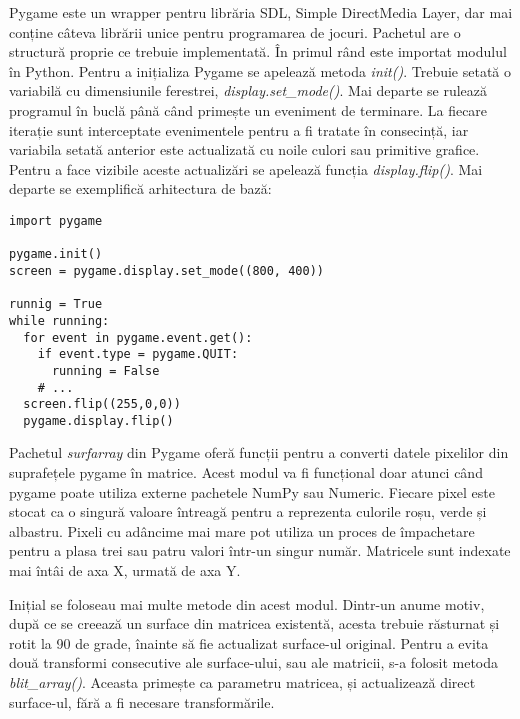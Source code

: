 Pygame este un wrapper pentru librăria SDL, Simple DirectMedia Layer, dar mai conține câteva librării unice pentru programarea de jocuri. Pachetul are o structură proprie ce trebuie implementată. În primul rând este importat modulul în Python. 
Pentru a inițializa Pygame se apelează metoda \textit{init()}. Trebuie setată o variabilă cu dimensiunile ferestrei, \textit{display.set\_mode()}. Mai departe se rulează programul în buclă până când primește un eveniment de terminare. La fiecare iterație sunt interceptate evenimentele pentru a fi tratate în consecință, iar variabila setată anterior este actualizată cu noile culori sau primitive grafice. Pentru a face vizibile aceste actualizări se apelează funcția \textit{display.flip()}. Mai departe se exemplifică arhitectura de bază:
\lstset{language=Python,frame=single, showstringspaces=false}
\begin{lstlisting}
import pygame

pygame.init()
screen = pygame.display.set_mode((800, 400))

runnig = True
while running:
  for event in pygame.event.get():
    if event.type = pygame.QUIT:
      running = False
    # ...
  screen.flip((255,0,0))
  pygame.display.flip()      
\end{lstlisting}


Pachetul \textit{surfarray} din Pygame oferă funcții pentru a converti datele pixelilor din suprafețele pygame în matrice. Acest modul va fi funcțional doar atunci când pygame poate utiliza externe pachetele NumPy sau Numeric. Fiecare pixel este stocat ca o singură valoare întreagă pentru a reprezenta culorile roșu, verde și albastru. Pixeli cu adâncime mai mare pot utiliza un proces de împachetare pentru a plasa trei sau patru valori într-un singur număr. Matricele sunt indexate mai întâi de axa X, urmată de axa Y.

Inițial se foloseau mai multe metode din acest modul. Dintr-un anume motiv, după ce se creează un surface din matricea existentă, acesta trebuie răsturnat și rotit la 90 de grade, înainte să fie actualizat surface-ul original. Pentru a evita două transformi consecutive ale surface-ului, sau ale matricii, s-a folosit metoda \textit{blit\_array()}. Aceasta primește ca parametru matricea, și actualizează direct surface-ul, fără a fi necesare transformările.














